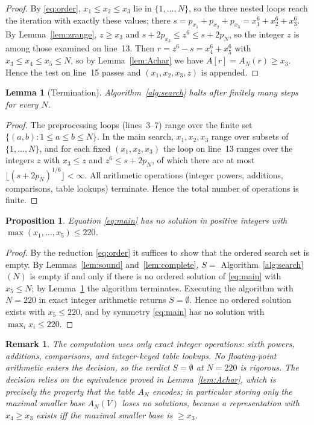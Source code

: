 \documentclass{amsart}
\newtheorem{proposition}{Proposition}
\newtheorem{lemma}{Lemma}
\newtheorem{remark}{Remark}
\begin{document}
\begin{proof}
By \eqref{eq:order}, $x_1\le x_2\le x_3$ lie in $\{1,\dots,N\}$, so the
three nested loops reach the iteration with exactly these values; there
$s=p_{x_1}+p_{x_2}+p_{x_3}=x_1^6+x_2^6+x_3^6$. By
Lemma~\ref{lem:zrange}, $z\ge x_3$ and $s+2p_{x_3}\le z^6\le s+2p_N$,
so the integer $z$ is among those examined on line~13. Then
$r=z^6-s=x_4^6+x_5^6$ with $x_3\le x_4\le x_5\le N$, so by
Lemma~\ref{lem:Achar} we have $A[r]=A_N(r)\ge x_3$. Hence the test on
line~15 passes and $(x_1,x_2,x_3,z)$ is appended.
\end{proof}

\begin{lemma}[Termination]\label{lem:term}
Algorithm~\ref{alg:search} halts after finitely many steps for every
$N$.
\end{lemma}

\begin{proof}
The preprocessing loops (lines~3--7) range over the finite set
$\{(a,b):1\le a\le b\le N\}$. In the main search, $x_1,x_2,x_3$ range
over subsets of $\{1,\dots,N\}$, and for each fixed $(x_1,x_2,x_3)$ the
loop on line~13 ranges over the integers $z$ with $x_3\le z$ and
$z^6\le s+2p_N$, of which there are at most
$\lfloor(s+2p_N)^{1/6}\rfloor<\infty$. All arithmetic operations
(integer powers, additions, comparisons, table lookups) terminate. Hence
the total number of operations is finite.
\end{proof}

\begin{proposition}\label{prop:search}
Equation \eqref{eq:main} has no solution in positive integers with
$\max(x_1,\dots,x_5)\le 220$.
\end{proposition}

\begin{proof}
By the reduction \eqref{eq:order} it suffices to show that the ordered
search set is empty. By Lemmas~\ref{lem:sound} and~\ref{lem:complete},
$S=$ Algorithm~\ref{alg:search}$(N)$ is empty if and only if there is
no ordered solution of \eqref{eq:main} with $x_5\le N$; by
Lemma~\ref{lem:term} the algorithm terminates. Executing the algorithm
with $N=220$ in exact integer arithmetic returns $S=\emptyset$. Hence
no ordered solution exists with $x_5\le 220$, and by symmetry
\eqref{eq:main} has no solution with $\max_i x_i\le 220$.
\end{proof}

\begin{remark}
The computation uses only exact integer operations: sixth powers,
additions, comparisons, and integer-keyed table lookups. No
floating-point arithmetic enters the decision, so the verdict
$S=\emptyset$ at $N=220$ is rigorous. The decision relies on the
equivalence proved in Lemma~\ref{lem:Achar}, which is precisely the
property that the table $A_N$ encodes; in particular storing only the
\emph{maximal} smaller base $A_N(V)$ loses no solutions, because a
representation with $x_4\ge x_3$ exists iff the maximal smaller base is
$\ge x_3$.
\end{remark}
\end{document}
